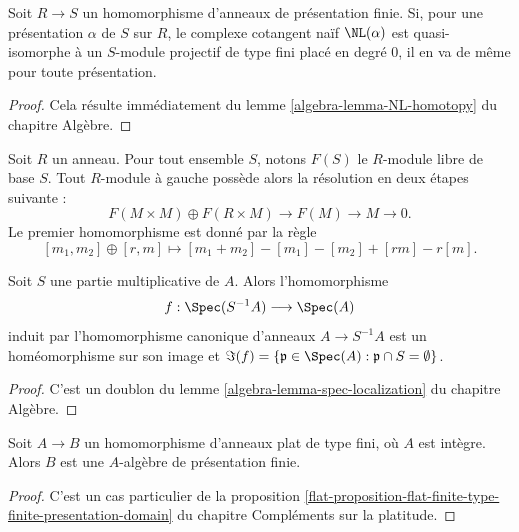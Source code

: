 \begin{lemma}
\label{lemma-smooth-independent-presentation}
Soit $R \to S$ un homomorphisme d'anneaux de présentation finie.
Si, pour une présentation $\alpha$ de $S$ sur $R$, le
complexe cotangent naïf $\NL(\alpha)$ est quasi-isomorphe
à un $S$-module projectif de type fini placé en degré $0$, il en va
de même pour toute présentation.
\end{lemma}

\begin{proof}
Cela résulte immédiatement du lemme \ref{algebra-lemma-NL-homotopy} du chapitre Algèbre.
\end{proof}

\begin{remark}
\label{remark-projective-resolution}
Soit $R$ un anneau.
Pour tout ensemble $S$, notons $F(S)$ le $R$-module libre de base $S$.
Tout $R$-module à gauche possède alors la résolution en deux étapes suivante :
$$
F(M \times M) \oplus F(R \times M) \to F(M) \to M \to 0.
$$
Le premier homomorphisme est donné par la règle
$$
[m_1, m_2] \oplus [r, m] \mapsto [m_1 + m_2] - [m_1] - [m_2] + [rm] - r[m].
$$
\end{remark}

\begin{lemma}
\label{lemma-spec-localization-first}
Soit $S$ une partie multiplicative de $A$. Alors l'homomorphisme
$$
f: \Spec(S^{-1}A)\longrightarrow \Spec(A)
$$
induit par l'homomorphisme canonique d'anneaux
$A \to S^{-1}A$ est un homéomorphisme sur son image et
$\Im(f) = \{ \mathfrak p \in \Spec(A) : \mathfrak p\cap S = \emptyset \}$.
\end{lemma}

\begin{proof}
C'est un doublon du lemme \ref{algebra-lemma-spec-localization} du chapitre Algèbre.
\end{proof}

\begin{lemma}
\label{lemma-finite-type-flat-over-integral-algebra}
Soit $A \to B$ un homomorphisme d'anneaux plat de type fini, où $A$ est
intègre. Alors $B$ est une $A$-algèbre de présentation finie.
\end{lemma}

\begin{proof}
C'est un cas particulier de la proposition
\ref{flat-proposition-flat-finite-type-finite-presentation-domain}
du chapitre Compléments sur la platitude.
\end{proof}

